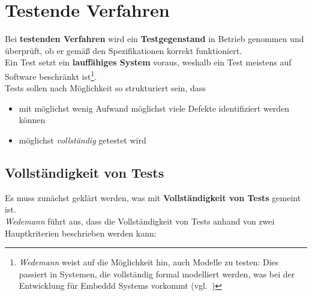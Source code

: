 \section{Testende Verfahren}
Bei \textbf{testenden Verfahren} wird ein \textbf{Testgegenstand} in Betrieb genommen und überprüft, ob er gemäß den Spezifikationen korrekt funktioniert.\\

\noindent
Ein Test setzt ein \textbf{lauffähiges System} voraus, weshalb ein Test meistens auf Software beschränkt ist\footnote{
\textit{Wedemann} weist auf die Möglichkeit hin, auch Modelle zu testen: Dies passiert in Systemen, die vollständig formal modelliert werden, was bei der Entwicklung für Embeddd Systems vorkommt (vgl.~\cite[41]{Wed09c})
}.\\

\noindent
Tests sollen nach Möglichkeit so strukturiert sein, dass
\begin{itemize}
    \item mit möglichst wenig Aufwand möglichst viele Defekte identifiziert werden können
    \item möglichst \textit{vollständig} getestet wird
\end{itemize}


\subsection*{Vollständigkeit von Tests}
Es muss zunächst geklärt werden, was mit \textbf{Vollständigkeit von Tests} gemeint ist.\\
\textit{Wedemann} führt aus, dass die Vollständigkeit von Tests anhand von zwei Hauptkriterien beschrieben werden kann:

